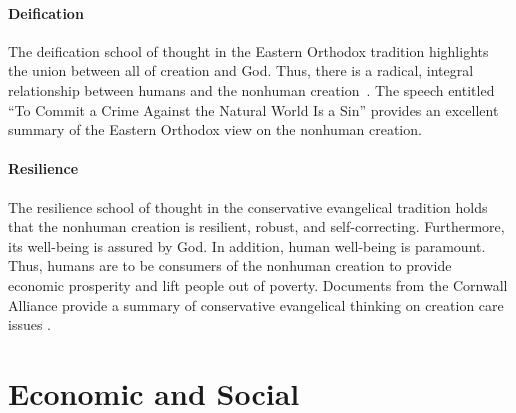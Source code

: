 \documentclass[12pt]{article}
\begin{document}
\paragraph{Deification} 
\label{sec:deification}

The deification school of thought in the Eastern Orthodox tradition
highlights the union between all of creation and God.
Thus, there is a radical, integral relationship between humans and 
the nonhuman creation~\autocite[93]{Jenkins:2008}.
The speech entitled ``To Commit a Crime Against the Natural World Is a Sin'' 
\autocite[133-136]{Bartholomew-I-of-Constantinople:2011aa}
provides an excellent summary of the Eastern Orthodox view
on the nonhuman creation.

\paragraph{Resilience} 
\label{sec:resilience}

The resilience school of thought in the conservative evangelical tradition
holds that the nonhuman creation is resilient, robust, and self-correcting.
Furthermore, its well-being is assured by God.
In addition, human well-being is paramount. 
Thus, humans are to be consumers of the nonhuman creation 
to provide economic prosperity and
lift people out of poverty.
Documents from the Cornwall Alliance 
provide a summary of conservative evangelical thinking on creation care issues
\autocite{Cornwall:2006aa}.



%
%
%



\section{Economic and Social}
\label{sec:economic}
\end{document}
